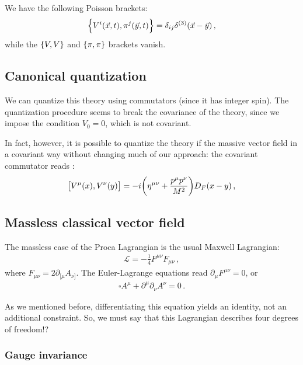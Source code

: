 \documentclass[main.tex]{subfiles}
\begin{document}
We have the following Poisson brackets: 
%
\begin{align}
\qty{V^{i} (\vec{x}, t), \pi^{j}(\vec{y}, t)} = \delta_{ij} \delta^{(3)} (\vec{x} - \vec{y})
\,,
\end{align}
%
while the \(\qty{V, V}\) and \(\qty{\pi, \pi }\) brackets vanish. 

\subsection{Canonical quantization}

We can quantize this theory using commutators (since it has integer spin).
The quantization procedure seems to break the covariance of the theory, since we impose the condition \(V_0 = 0\), which is not covariant. 

In fact, however, it is possible to quantize the theory if the massive vector field in a covariant way without changing much of our approach: the covariant commutator reads \cite[eq.\ 6.98]{greinerFieldQuantization1996}: 
%
\begin{align}
\qty[V^{\mu }(x), V^{\nu }(y)] = -i \qty(\eta^{\mu \nu } + \frac{p^{\mu }p^{\nu }}{M^2}) D_F(x-y)
\,,
\end{align}
%


\subsection{Massless classical vector field}

The massless case of the Proca Lagrangian is the usual Maxwell Lagrangian: 
%
\begin{align}
\mathscr{L} = - \frac{1}{4} F^{\mu \nu } F_{\mu \nu }
\,,
\end{align}
%
where \(F_{\mu \nu } = 2 \partial_{[\mu } A_{\nu ]}\). 
The Euler-Lagrange equations read \(\partial_{\mu } F^{\mu \nu } = 0\), or 
%
\begin{align}
\square A^{\mu } + \partial^{\mu } \partial_{\nu } A^{\nu } = 0
\,.
\end{align}

As we mentioned before, differentiating this equation yields an identity, not an additional constraint. So, we must say that this Lagrangian describes four degrees of freedom!?

\subsubsection{Gauge invariance}
\end{document}

